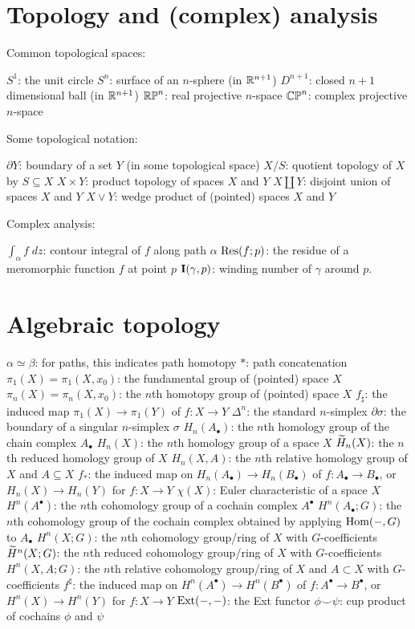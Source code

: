 \section{Topology and (complex) analysis}
Common topological spaces:
\begin{itemize}
	\ii $S^1$: the unit circle
	\ii $S^n$: surface of an $n$-sphere (in $\mathbb R^{n+1}$)
	\ii $D^{n+1}$: closed $n+1$ dimensional ball (in $\mathbb R^{n+1}$)
	\ii $\mathbb{RP}^n$: real projective $n$-space
	\ii $\mathbb{CP}^n$: complex projective $n$-space
\end{itemize}
Some topological notation:
\begin{itemize}
	\ii $\partial Y$: boundary of a set $Y$ (in some topological space)
	\ii $X/S$: quotient topology of $X$ by $S \subseteq X$
	\ii $X \times Y$: product topology of spaces $X$ and $Y$
	\ii $X \amalg Y$: disjoint union of spaces $X$ and $Y$
	\ii $X \vee Y$: wedge product of (pointed) spaces $X$ and $Y$
\end{itemize}
Complex analysis:
\begin{itemize}
	\ii $\int_\alpha f \; dz$: contour integral of $f$ along path $\alpha$
	\ii $\operatorname{Res}(f;p)$: the residue of a meromorphic function $f$ at point $p$
	\ii $\operatorname{\mathbf I}(\gamma, p)$: winding number of $\gamma$ around $p$.
\end{itemize}

\section{Algebraic topology}
\begin{itemize}
	\ii $\alpha \simeq \beta$: for paths, this indicates path homotopy
	\ii $\ast$: path concatenation
	\ii $\pi_1(X) = \pi_1(X, x_0)$: the fundamental group of (pointed) space $X$
	\ii $\pi_n(X) = \pi_n(X, x_0)$: the $n$th homotopy group of (pointed) space $X$
	\ii $f_\sharp$: the induced map $\pi_1(X) \to \pi_1(Y)$ of $f : X \to Y$
	\ii $\Delta^n$: the standard $n$-simplex
	\ii $\partial\sigma$: the boundary of a singular $n$-simplex $\sigma$
	\ii $H_n(A_\bullet)$: the $n$th homology group of the chain complex $A_\bullet$
	\ii $H_n(X)$: the $n$th homology group of a space $X$
	\ii $\widetilde H_n(X)$: the $n$th reduced homology group of $X$
	\ii $H_n(X, A)$: the $n$th relative homology group of $X$ and $A \subseteq X$
	\ii $f_\ast$: the induced map on $H_n(A_\bullet) \to H_n(B_\bullet)$
	of $f : A_\bullet \to B_\bullet$,
	or $H_n(X) \to H_n(Y)$ for $f : X \to Y$
	\ii $\chi(X)$: Euler characteristic of a space $X$
	\ii $H^n(A^\bullet)$: the $n$th cohomology group of a cochain complex $A^\bullet$
	\ii $H^n(A_\bullet; G)$: the $n$th cohomology group of the cochain complex
	obtained by applying $\operatorname{Hom}(-,G)$ to $A_\bullet$
	\ii $H^n(X; G)$: the $n$th cohomology group/ring of $X$ with $G$-coefficients
	\ii $\widetilde H^n(X; G)$: the $n$th reduced cohomology group/ring of $X$ with $G$-coefficients
	\ii $H^n(X,A ; G)$: the $n$th relative cohomology group/ring of $X$ and $A \subset X$ with $G$-coefficients
	\ii $f^\sharp$: the induced map on $H^n(A^\bullet) \to H^n(B^\bullet)$
	of $f : A^\bullet \to B^\bullet$,
	or $H^n(X) \to H^n(Y)$ for $f : X \to Y$
	\ii $\operatorname{Ext}(-,-)$: the Ext functor
	\ii $\phi \smile \psi$: cup product of cochains $\phi$ and $\psi$
\end{itemize}


